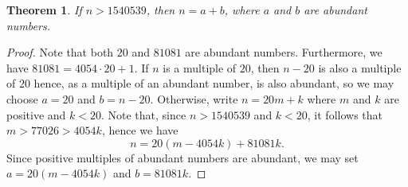 \documentclass[12pt]{article}
\newtheorem{thm}{Theorem}
\begin{document}
\begin{thm}
If $n > 1540539$, then $n = a + b$, where $a$ and
$b$ are abundant numbers.
\end{thm}

\begin{proof}
Note that both $20$ and $81081$ are abundant numbers.
Furthermore, we have $81081 = 4054 \cdot 20 + 1$.
If $n$ is a multiple of $20$, then $n-20$ is also 
a multiple of $20$ hence, as a multiple of an abundant
number, is also abundant, so we may choose $a = 20$ 
and $b = n-20$.  Otherwise, write $n = 20 m + k$ where
$m$ and $k$ are positive and $k < 20$.  Note that,
since $n > 1540539$ and $k < 20$, it follows that
$m > 77026 > 4054 k$, hence we have
\[
n = 20 (m - 4054 k) + 81081 k.
\]  
Since positive multiples of abundant numbers are 
abundant, we may set $a = 20 (m - 4054 k)$ and
$b = 81081 k$.
\end{proof}

\end{document}
